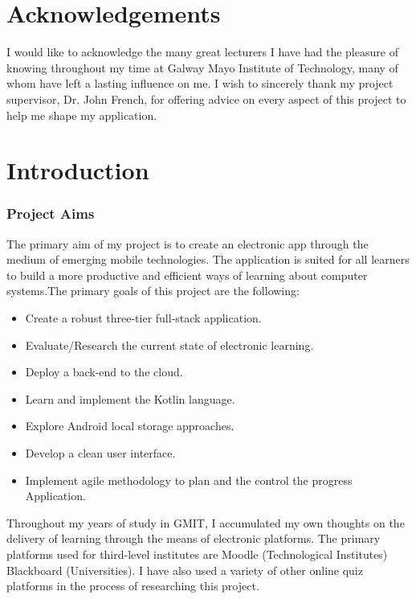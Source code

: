 \chapter*{Acknowledgements}

I would like to acknowledge the many great lecturers I have had the pleasure of knowing throughout my time at Galway Mayo Institute of Technology, many of whom have left a lasting influence on me.
I  wish to sincerely thank my project supervisor, Dr. John French, for offering advice on every aspect of this project to help me shape my application.

\chapter{Introduction}


 \subsection{Project Aims}
 The primary aim of my project is to create an electronic app through the medium of emerging mobile technologies. The application is suited for all learners to build a more  productive and efficient ways of learning about computer systems.The primary goals of this project are the following:
 
     \begin{itemize}
     \item Create a robust three-tier full-stack application.
     \item Evaluate/Research the current state of electronic learning.
     \item Deploy a back-end  to the cloud.
      \item Learn and implement the Kotlin language.
     \item Explore Android local storage approaches. 
      \item Develop a clean user interface. 
      \item Implement  agile methodology  to plan and the control the progress  Application.


     
    \end{itemize}


    Throughout my years of study in GMIT, I accumulated my own thoughts on the delivery of learning through the means of electronic platforms. The primary platforms used for third-level institutes are Moodle (Technological Institutes) Blackboard (Universities). I have also used a variety of other online quiz platforms in the process of researching this project.
 
